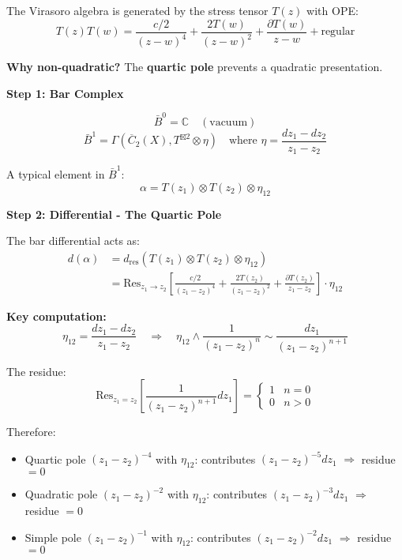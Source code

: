 \begin{example}
\label{ex:virasoro-completion}

The Virasoro algebra is generated by the stress tensor $T(z)$ with OPE:
$$T(z)T(w) = \frac{c/2}{(z-w)^4} + \frac{2T(w)}{(z-w)^2} + \frac{\partial T(w)}{z-w} + \text{regular}$$

\textbf{Why non-quadratic?} The \textbf{quartic pole} prevents a quadratic presentation.

\medskip
\noindent\textbf{Step 1: Bar Complex}

$$\bar{B}^0 = \mathbb{C} \quad (\text{vacuum})$$
$$\bar{B}^1 = \Gamma(\overline{C}_2(X), T^{\boxtimes 2} \otimes \eta) \quad \text{where } \eta = \frac{dz_1 - dz_2}{z_1 - z_2}$$

A typical element in $\bar{B}^1$:
$$\alpha = T(z_1) \otimes T(z_2) \otimes \eta_{12}$$

\medskip
\noindent\textbf{Step 2: Differential - The Quartic Pole}

The bar differential acts as:
\begin{align*}
d(\alpha) &= d_{\text{res}}(T(z_1) \otimes T(z_2) \otimes \eta_{12}) \\
&= \text{Res}_{z_1 \to z_2}\left[\frac{c/2}{(z_1-z_2)^4} + \frac{2T(z_2)}{(z_1-z_2)^2} + \frac{\partial T(z_2)}{z_1-z_2}\right] \cdot \eta_{12}
\end{align*}

\textbf{Key computation:}
$$\eta_{12} = \frac{dz_1 - dz_2}{z_1 - z_2} \quad \Rightarrow \quad \eta_{12} \wedge \frac{1}{(z_1-z_2)^n} \sim \frac{dz_1}{(z_1-z_2)^{n+1}}$$

The residue:
$$\text{Res}_{z_1=z_2}\left[\frac{1}{(z_1-z_2)^{n+1}} dz_1\right] = \begin{cases} 1 & n = 0 \\ 0 & n > 0 \end{cases}$$

Therefore:
\begin{itemize}
\item Quartic pole $(z_1-z_2)^{-4}$ with $\eta_{12}$: contributes $(z_1-z_2)^{-5} dz_1$ $\Rightarrow$ residue $= 0$
\item Quadratic pole $(z_1-z_2)^{-2}$ with $\eta_{12}$: contributes $(z_1-z_2)^{-3} dz_1$ $\Rightarrow$ residue $= 0$
\item Simple pole $(z_1-z_2)^{-1}$ with $\eta_{12}$: contributes $(z_1-z_2)^{-2} dz_1$ $\Rightarrow$ residue $= 0$
\end{itemize}


\end{example}
